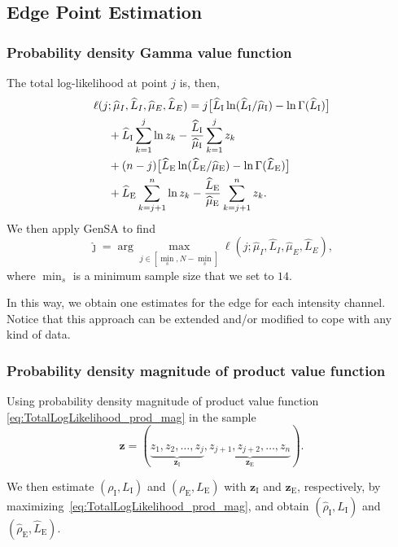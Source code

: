\documentclass[journal]{IEEEtran}
\begin{document}
\subsection{Edge Point Estimation}
\subsubsection{Probability density Gamma value function}
The total log-likelihood at point $j$ is, then,
\begin{equation}\label{eq:TotalLogLikelihood}
\begin{split}
\ell(j&;\widehat{\mu}_I, \widehat{L}_I,\widehat{\mu}_E, \widehat{L}_E)= j \big[\widehat{L}_\text{I}\ln (\widehat{L}_\text{I} / \widehat{\mu}_\text{I})- \ln \Gamma(\widehat{L}_\text{I})\big]\\
             &+\widehat{L}_\text{I} \sum_{k=1}^{j}\ln z_k -\frac{\widehat{L}_\text{I}}{\widehat{\mu}_\text{I}}\sum_{k=1}^{j} z_k\\
             & + (n-j) \big[\widehat{L}_\text{E}\ln (\widehat{L}_\text{E} / \widehat{\mu}_\text{E}) - \ln \Gamma(\widehat{L}_\text{E})\big]\\
             &+\widehat{L}_\text{E} \sum_{k=j+1}^{n}\ln z_k -\frac{\widehat{L}_\text{E}}{\widehat{\mu}_\text{E}}\sum_{k=j+1}^{n} z_k.
\raisetag{2.2em}
\end{split}
\end{equation}
We then apply GenSA to find  
$$
\widehat{\jmath}= \arg\max\limits_{j\in [\min_s,N-\min_s]}\ell(j;\widehat{\mu}_I, \widehat{L}_I,\widehat{\mu}_E, \widehat{L}_E),
$$ 
where $\min_s$ is a minimum sample size that we set to $14$.

In this way, we obtain one estimates for the edge for each intensity channel.
Notice that this approach can be extended and/or modified to cope with any kind of data.


\subsubsection{Probability density magnitude of product value function}
Using probability density magnitude of product value function \eqref{eq:TotalLogLikelihood_prod_mag} in the sample
$$
\bm z = (\underbrace{z_1,z_2,\dots,z_j}_{\bm z_\text{I}}, 
\underbrace{z_{j+1}, z_{j+2},\dots,z_n}_{\bm z_\text{E}}).
$$

We then estimate $(\rho_\text{I},L_\text{I})$ and $(\rho_\text{E},L_\text{E})$ with $\bm z_\text{I}$ and $\bm z_\text{E}$, respectively, by maximizing~\eqref{eq:TotalLogLikelihood_prod_mag}, and obtain $(\widehat{\rho}_\text{I}, \widehat{L}_\text{I})$ and $(\widehat{\rho}_\text{E}, \widehat{L}_\text{E})$.
\end{document}
